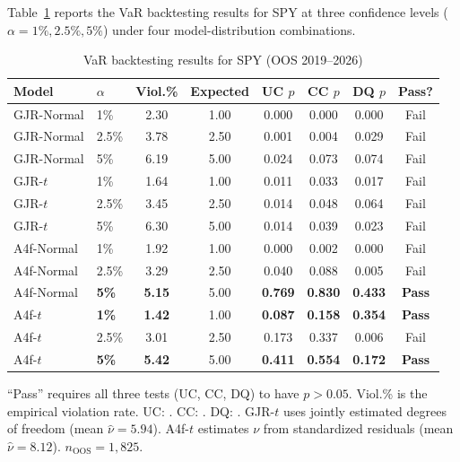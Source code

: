 \documentclass[12pt,a4paper]{article}
\begin{document}
Table~\ref{tab:var_results} reports the VaR backtesting results for SPY at three confidence levels ($\alpha = 1\%, 2.5\%, 5\%$) under four model-distribution combinations.

\begin{table}[H]
\centering
\caption{VaR backtesting results for SPY (OOS 2019--2026)}
\label{tab:var_results}
\begin{threeparttable}
\small
\begin{tabular}{@{}llcccccc@{}}
\toprule
Model & $\alpha$ & Viol.\% & Expected & UC $p$ & CC $p$ & DQ $p$ & Pass? \\
\midrule
GJR-Normal & 1\% & 2.30 & 1.00 & 0.000 & 0.000 & 0.000 & Fail \\
GJR-Normal & 2.5\% & 3.78 & 2.50 & 0.001 & 0.004 & 0.029 & Fail \\
GJR-Normal & 5\% & 6.19 & 5.00 & 0.024 & 0.073 & 0.074 & Fail \\
\midrule
GJR-$t$ & 1\% & 1.64 & 1.00 & 0.011 & 0.033 & 0.017 & Fail \\
GJR-$t$ & 2.5\% & 3.45 & 2.50 & 0.014 & 0.048 & 0.064 & Fail \\
GJR-$t$ & 5\% & 6.30 & 5.00 & 0.014 & 0.039 & 0.023 & Fail \\
\midrule
A4f-Normal & 1\% & 1.92 & 1.00 & 0.000 & 0.002 & 0.000 & Fail \\
A4f-Normal & 2.5\% & 3.29 & 2.50 & 0.040 & 0.088 & 0.005 & Fail \\
A4f-Normal & \textbf{5\%} & \textbf{5.15} & 5.00 & \textbf{0.769} & \textbf{0.830} & \textbf{0.433} & \textbf{Pass} \\
\midrule
A4f-$t$ & \textbf{1\%} & \textbf{1.42} & 1.00 & \textbf{0.087} & \textbf{0.158} & \textbf{0.354} & \textbf{Pass} \\
A4f-$t$ & 2.5\% & 3.01 & 2.50 & 0.173 & 0.337 & 0.006 & Fail \\
A4f-$t$ & \textbf{5\%} & \textbf{5.42} & 5.00 & \textbf{0.411} & \textbf{0.554} & \textbf{0.172} & \textbf{Pass} \\
\bottomrule
\end{tabular}
\begin{tablenotes}
\footnotesize
\item ``Pass'' requires all three tests (UC, CC, DQ) to have $p > 0.05$. Viol.\% is the empirical violation rate. UC: \citet{kupiec1995}. CC: \citet{christoffersen1998}. DQ: \citet{engle2004}. GJR-$t$ uses jointly estimated degrees of freedom (mean $\hat\nu = 5.94$). A4f-$t$ estimates $\nu$ from standardized residuals (mean $\hat\nu = 8.12$). $n_{\text{OOS}} = 1{,}825$.
\end{tablenotes}
\end{threeparttable}
\end{table}
\end{document}
